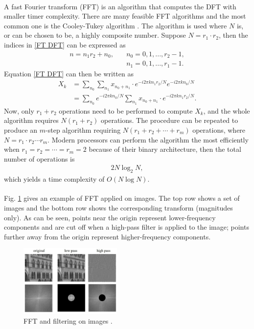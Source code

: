 \documentclass[12pt, twocolumn]{report}
\begin{document}
\paragraph{}
A fast Fourier transform (FFT) is an algorithm that computes the DFT with smaller timer complexity. There are many feasible FFT algorithms and the most common one is the Cooley-Tukey algorithm \cite{FT FFT}. The algorithm is used where $N$ is, or can be chosen to be, a highly composite number. Suppose $N = r_1 \cdot r_2$, then the indices in \eqref{FT DFT} can be expressed as
\begin{align*}
    n = n_1r_2 + n_0, \quad & n_0 = 0, 1, ..., r_2 - 1, \\
    & n_1 = 0, 1, ..., r_1 - 1.
\end{align*}
Equation \eqref{FT DFT} can then be written as
\begin{align*}
    X_k & = \sum_{n_0}\sum_{n_1} x_{n_0 + n_1} \cdot e^{-i2\pi kn_1r_2/N} e^{-i2\pi kn_0/N} \\
    & = \sum_{n_0} e^{-i2\pi kn_0/N} \sum_{n_1} x_{n_0 + n_1} \cdot e^{-i2\pi kn_1r_2/N}.
\end{align*}
Now, only $r_1 + r_2$ operations need to be performed to compute $X_k$, and the whole algorithm requires $N(r_1 + r_2)$ operations. The procedure can be repeated to produce an $m$-step algorithm requiring $N(r_1 + r_2 + \cdots + r_m)$ operations, where $N = r_1 \cdot r_2 \cdots r_m$. Modern processors can perform the algorithm the most efficiently when $r_1 = r_2 = \cdots = r_m = 2$ because of their binary architecture, then the total number of operations is
\begin{align*}
    2N\log_2 N,
\end{align*}
which yields a time complexity of $O(N\log N)$. 

\paragraph{}
Fig. \ref{FT FFT on images} gives an example of FFT applied on images. The top row shows a set of images and the bottom row shows the corresponding transform (magnitudes only). As can be seen, points near the origin represent lower-frequency components and are cut off when a high-pass filter is applied to the image; points further away from the origin represent higher-frequency components.

\begin{figure}[htbp]
    \centering
    \includegraphics[width=0.45\textwidth]{Figures/FT FFT on images cropped.jpg}
    \caption{FFT and filtering on images \cite{FT lecture}.}
    \label{FT FFT on images}
\end{figure}
\end{document}
